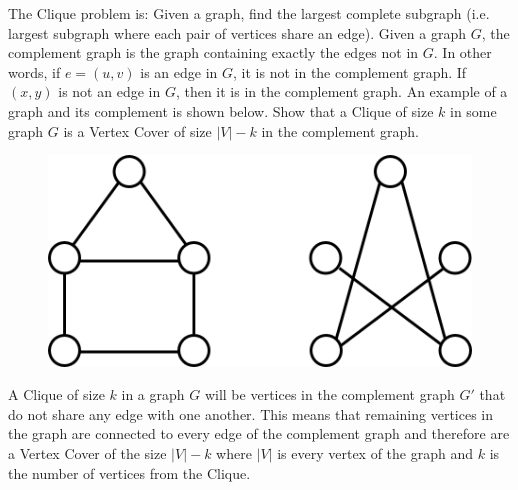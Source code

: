 \documentclass[12pt]{article}
\newenvironment{problem}[2][Problem]
{\begin{trivlist}
\item[\hskip \labelsep {\bfseries #1}\hskip \labelsep {\bfseries #2.}]}{\end{trivlist}}
\begin{document}
\begin{problem}{2*}
The Clique problem is: Given a graph, find the largest complete subgraph (i.e. largest subgraph where each pair of vertices share an edge). Given a graph $G$, the complement graph is the graph containing exactly the edges not in $G$. In other words, if $e=(u,v)$ is an edge in $G$, it is not in the complement graph. If $(x,y)$ is not an edge in $G$, then it is in the complement graph. An example of a graph and its complement is shown below. Show that a Clique of size $k$ in some graph $G$ is a Vertex Cover of size $|V|-k$ in the complement graph.

\begin{figure}[H]
\centering
\includegraphics[scale=.5]{Homework5_comp.png}
\end{figure}


A Clique of size $k$ in a graph $G$ will be vertices in the complement graph $G'$ that do not share any edge with one another. This means that remaining vertices in the graph are connected to every edge of the complement graph and therefore are a Vertex Cover of the size $|V|-k$ where $|V|$ is every vertex of the graph and $k$ is the number of vertices from the Clique.
\end{problem}
\end{document}
